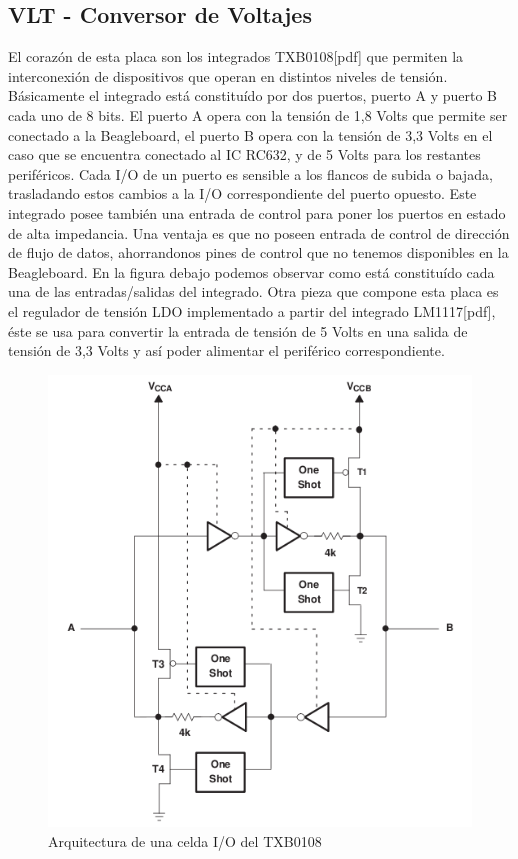 \subsection{VLT - Conversor de Voltajes}
El corazón de esta placa son los integrados TXB0108[pdf] que permiten la interconexión de dispositivos que operan en distintos niveles de tensión. Básicamente el integrado está constituído por dos puertos, puerto A y puerto B cada uno de 8 bits. El puerto A opera con la tensión de 1,8 Volts que permite ser conectado a la Beagleboard, el puerto B opera con la tensión de 3,3 Volts en el caso que se encuentra conectado al IC RC632, y de 5 Volts para los restantes periféricos.
Cada I/O de un puerto es sensible a los flancos de subida o bajada, trasladando estos cambios a la I/O correspondiente del puerto opuesto. 
Este integrado posee también una entrada de control para poner los puertos en estado de alta impedancia.
Una ventaja es que no poseen entrada de control de dirección de flujo de datos, ahorrandonos pines de control que no tenemos disponibles en la Beagleboard.
En la figura debajo podemos observar como está constituído cada una de las entradas/salidas del integrado.
Otra pieza que compone esta placa es el regulador de tensión LDO implementado a partir del integrado LM1117[pdf], éste se usa para convertir la entrada de tensión de 5 Volts en una salida de tensión de 3,3 Volts y así poder alimentar el periférico correspondiente.

\begin{figure}[H]
\centering
  \begin{center}
  \includegraphics[scale=.4]{Imagenes/TXB0108.png} 
  \end{center}
  \caption{Arquitectura de una celda I/O del TXB0108}\label{Fig:HW} 
\end{figure}

